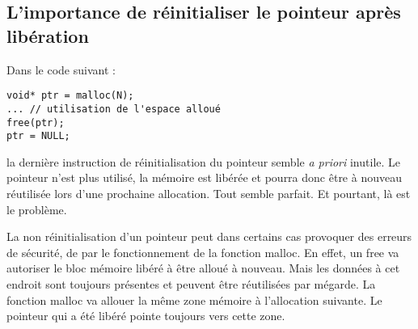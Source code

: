 \documentclass[../../../main.tex]{subfiles}
\begin{document}
\subsection{L'importance de réinitialiser le pointeur après libération}
\label{sub:l_importance_de_r_initialiser_le_pointeur_apr_s_lib_ration}
Dans le code suivant :
\begin{verbatim}
void* ptr = malloc(N);
... // utilisation de l'espace alloué
free(ptr);
ptr = NULL;
\end{verbatim}
la dernière instruction de réinitialisation du pointeur semble \textit{a priori} inutile. Le pointeur n'est plus utilisé, la mémoire est libérée et pourra donc être à nouveau réutilisée lors d'une prochaine allocation. Tout semble parfait. Et pourtant, là est le problème.

La non réinitialisation d'un pointeur peut dans certains cas provoquer des erreurs de sécurité, de par le fonctionnement de la fonction \textsf{malloc}. En effet, un \textsf{free} va autoriser le bloc mémoire libéré à être alloué à nouveau. Mais les données à cet endroit sont toujours présentes et peuvent être réutilisées par mégarde. La fonction \textsf{malloc} va allouer la même zone mémoire à l'allocation suivante. Le pointeur qui a été libéré pointe toujours vers cette zone.
\end{document}
